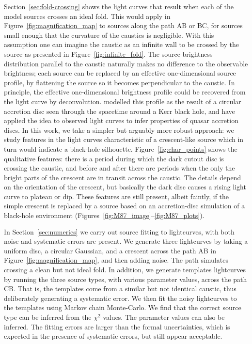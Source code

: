 \documentclass[usenatbib]{mn2e}
\begin{document}
Section~\ref{sec:fold-crossing} shows the light curves that result
when each of the model sources crosses an ideal fold.  This would
apply in Figure~\ref{fig:magnification_map} to sources along the path
AB or BC, for sources small enough that the curvature of the caustics
is negligible.  With this assumption one can imagine the caustic as an
infinite wall to be crossed by the source as presented in
Figure~\ref{fig:infinite_fold}.  The source brightness distribution
parallel to the caustic naturally makes no difference to the
observable brightness; each source can be replaced by an effective
one-dimensional source profile, by flattening the source so it becomes
perpendicular to the caustic.  In principle, the effective
one-dimensional brightness profile could be recovered from the light
curve by deconvolution.  \cite{1999ApJ...524...49A} modelled this
profile as the result of a circular accretion disc seen through the
spacetime around a Kerr black hole, and \cite{2012MNRAS.423..676A}
have applied the idea to observed light curves to infer properties of
quasar accretion discs.  In this work, we take a simpler but arguably
more robust approach: we study features in the light curves
characteristic of a crescent-like source which in turn would indicate
a black-hole silhouette.  Figure~\ref{fig:char_points} shows the
qualitative features: there is a period during which the dark cutout
disc is crossing the caustic, and before and after there are periods
when the only the bright parts of the crescent are in transit across
the caustic.  The details depend on the orientation of the crescent,
but basically the dark disc causes a rising light curve to plateau or
dip.  These features are still present, albeit faintly, if the simple
crescent is replaced by a source based on an accretion-disc simulation
of a black-hole environment
(Figures~\ref{fig:M87_image}--\ref{fig:M87_plots}).


In Section~\ref{sec:numerics} we carry out source fitting to
lightcurves, with both noise and systematic errors are present.  We
generate three lightcurves by taking a uniform disc, a circular
Gaussian, and a crescent across the path AB in
Figure~\ref{fig:magnification_map}, and then adding noise.  The path
simulates crossing a clean but not ideal fold.  In addition, we
generate templates lightcurves by running the three source types, with
various parameter values, across the path CB.  That is, the templates
come from a similar but not identical caustic, thus deliberately
generating a systematic error.  We then fit the noisy lightcurves to
the templates using Markov chain Monte-Carlo.  We find that the
correct source type can be inferred from the $\chi^2$ values.  The
parameter values can also be inferred. The fitting errors are larger
than the formal uncertainties, which is expected in the presence of
systematic errors, but still appear acceptable.
\end{document}
